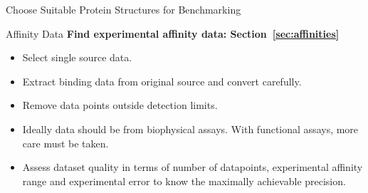 \documentclass[9pt,bestpractices,pubversion]{livecoms}
\begin{document}
\begin{Checklists*}[!hp]
\begin{checklist}{Choose Suitable Protein Structures for Benchmarking}
\end{checklist}
%
\begin{checklist}{Affinity Data}
\textbf{Find experimental affinity data: Section~\ref{sec:affinities}}
    \begin{itemize}
    \item Select single source data.
    \item Extract binding data from original source and convert carefully.
    \item Remove data points outside detection limits.
    \item Ideally data should be from biophysical assays. With functional assays, more care must be taken.
    \item Assess dataset quality in terms of number of datapoints, experimental affinity range and experimental error to know the maximally achievable precision.
    \end{itemize}
\end{checklist}
\end{Checklists*}
%
\end{document}
